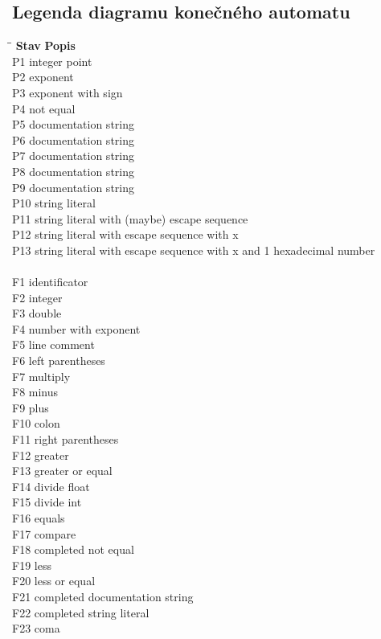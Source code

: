 \documentclass[a4paper, 11pt]{article}
\begin{document}
\subsection{Legenda diagramu konečného automatu}
\begin{tabbing}
    \hspace*{2.75cm}\=\hspace*{1.25cm}\= \kill
    \textbf{Stav} \> \textbf{Popis}  \\
      P1    \>  integer point    \\
      P2    \>  exponent   \\
      P3    \>  exponent with sign  \\
      P4    \>  not equal  \\
      P5    \>  documentation string  \\
      P6    \>  documentation string  \\
      P7    \>  documentation string  \\
      P8    \>  documentation string  \\
      P9    \>  documentation string  \\
      P10   \>  string literal  \\
      P11   \>  string literal with (maybe) escape sequence  \\
      P12   \>  string literal with escape sequence with x  \\
      P13   \>  string literal with escape sequence with x and 1 hexadecimal number  \\
            \>    \\
      F1    \> identificator   \\
      F2    \> integer   \\
      F3    \> double   \\
      F4    \> number with exponent   \\
      F5    \> line comment   \\
      F6    \> left parentheses   \\
      F7    \> multiply   \\
      F8    \> minus   \\
      F9    \> plus   \\
      F10   \> colon   \\
      F11   \> right parentheses   \\
      F12   \> greater   \\
      F13   \> greater or equal   \\
      F14   \> divide float   \\
      F15   \> divide int   \\
      F16   \> equals   \\
      F17   \> compare   \\
      F18   \> completed not equal   \\
      F19   \> less   \\
      F20   \> less or equal   \\
      F21   \> completed documentation string   \\
      F22   \> completed string literal   \\
      F23   \> coma   \\
    

\end{tabbing}
\end{document}
